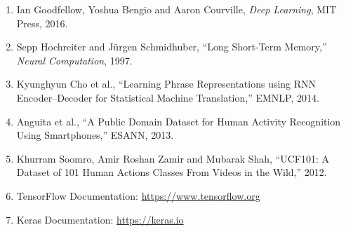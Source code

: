 \documentclass[10pt]{article}
\begin{document}
\begin{enumerate}
\item Ian Goodfellow, Yoshua Bengio and Aaron Courville,
\emph{Deep Learning}, MIT Press, 2016.

\item Sepp Hochreiter and J\"{u}rgen Schmidhuber,
``Long Short-Term Memory,'' \emph{Neural Computation}, 1997.

\item Kyunghyun Cho et al.,
``Learning Phrase Representations using RNN Encoder--Decoder for
Statistical Machine Translation,'' EMNLP, 2014.

\item Anguita et al.,
``A Public Domain Dataset for Human Activity Recognition Using Smartphones,''
ESANN, 2013.

\item Khurram Soomro, Amir Roshan Zamir and Mubarak Shah,
``UCF101: A Dataset of 101 Human Actions Classes From Videos in the Wild,'' 2012.

\item TensorFlow Documentation: \url{https://www.tensorflow.org}

\item Keras Documentation: \url{https://keras.io}
\end{enumerate}
\end{document}
